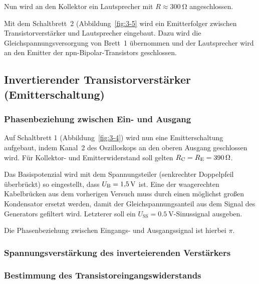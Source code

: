 Nun wird an den Kollektor ein Lautsprecher mit $R \approx \SI{300}{\ohm}$
angeschlossen. 


Mit dem Schaltbrett~2 (Abbildung~\ref{fig:3-5} wird ein Emitterfolger zwischen
Transistorverstärker und Lautsprecher eingebaut. Dazu wird die
Gleichspannungsversorgung von Brett~1 übernommen und der Lautsprecher wird an
den Emitter der npn-Bipolar-Transistors geschlossen.


\subsection{Invertierender Transistorverstärker (Emitterschaltung)}

\subsubsection{Phasenbeziehung zwischen Ein- und Ausgang}

Auf Schaltbrett 1 (Abbildung~\ref{fig:3-4}) wird nun eine Emitterschaltung
aufgebaut, indem Kanal~2 des Oszilloskops an den oberen Ausgang geschlossen
wird. Für Kollektor- und Emitterwiderstand soll gelten $R_\text{C} = R_\text{E} =
\SI{390}{\ohm}$.

Das Basispotenzial wird mit dem Spannungsteiler (senkrechter Doppelpfeil
überbrückt) so eingestellt, dass $U_\text{B} = \SI {1.5}{\volt}$ ist.  Eine der
waagerechten Kabelbrücken aus dem vorherigen Versuch muss durch einen möglichst
großen Kondensator ersetzt werden, damit der Gleichspannungsanteil aus dem
Signal des Generators gefiltert wird. Letzterer soll ein
$U_\text{SS}=\SI{0.5}{\volt}$-Sinussignal ausgeben.

Die Phasenbeziehung zwischen Eingangs- und Ausgangssignal ist hierbei $\pi$.

\subsubsection{Spannungsverstärkung des inverteierenden Verstärkers}

\fehlt

\subsubsection{Bestimmung des Transistoreingangswiderstands}

\fehlt

